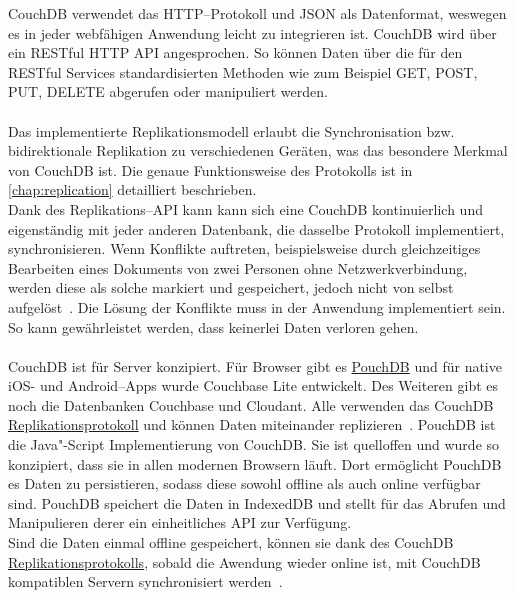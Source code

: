 CouchDB verwendet das \gls{HTTP}--Protokoll und \gls{JSON} als Datenformat, weswegen es in jeder webfähigen Anwendung leicht zu integrieren ist.
CouchDB wird über ein \gls{REST}ful \gls{HTTP} \gls{API} angesprochen. So können Daten über die für den \gls{REST}ful Services standardisierten Methoden wie zum Beispiel GET, POST, PUT, DELETE abgerufen oder manipuliert werden.\\\\
%
%
Das implementierte Replikationsmodell erlaubt die Synchronisation bzw. bidirektionale Replikation zu verschiedenen Geräten, was das besondere Merkmal von CouchDB ist.
Die genaue Funktionsweise des Protokolls ist in \autoref{chap:replication} detailliert beschrieben.\\
% 
Dank des Replikations--\gls{API} kann kann sich eine CouchDB kontinuierlich und eigenständig mit jeder anderen Datenbank, die dasselbe Protokoll implementiert, synchronisieren.
Wenn Konflikte auftreten, beispielsweise durch gleichzeitiges Bearbeiten eines Dokuments von zwei Personen ohne Netzwerkverbindung, werden diese als solche markiert und gespeichert, jedoch nicht von selbst aufgelöst~\cite{couch}.
Die Lösung der Konflikte muss in der Anwendung implementiert sein.
So kann gewährleistet werden, dass keinerlei Daten verloren gehen.\\\\
%
%
CouchDB ist für Server konzipiert. Für Browser gibt es \hyperref[chap:pouch]{PouchDB} und für native iOS- und Android--\glspl{App} wurde Couchbase Lite entwickelt.
Des Weiteren gibt es noch die Datenbanken Couchbase und Cloudant.
Alle verwenden das CouchDB \hyperref[chap:replication]{Replikationsprotokoll} und können Daten miteinander replizieren~\cite{couch}.
%
%
PouchDB ist die Java"-Script Implementierung von CouchDB.
Sie ist quelloffen und wurde so konzipiert, dass sie in allen modernen Browsern läuft. Dort ermöglicht PouchDB es Daten zu persistieren, sodass diese sowohl offline als auch online verfügbar sind.
PouchDB speichert die Daten in IndexedDB und stellt für das Abrufen und Manipulieren derer ein einheitliches \gls{API} zur Verfügung.\\
Sind die Daten einmal offline gespeichert, können sie dank des CouchDB \hyperref[chap:replication]{Replikationsprotokolls}, sobald die Awendung wieder online ist, mit CouchDB kompatiblen Servern synchronisiert werden~\cite{pouch}.